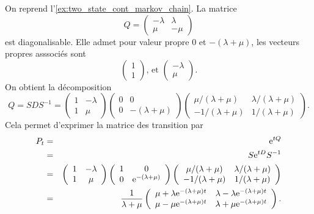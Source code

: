 \begin{ex}\label{ex:two_state_exp}
On reprend l'\cref{ex:two_state_cont_markov_chain}. La matrice 
$$
Q = \left(\begin{array}{cc}
-\lambda & \lambda\\
\mu & -\mu
\end{array}\right)
$$
est diagonalisable. Elle admet pour valeur propre $0$ et $-(\lambda + \mu)$, les vecteurs propres asssociés sont 
$$
\left(\begin{array}{c} 1\\
1\end{array}\right)\text{, et } \left(\begin{array}{c} -\lambda\\
\mu\end{array}\right).
$$
On obtient la décomposition
$$
Q = S D S^{-1} = \left(\begin{array}{cc}
1& -\lambda\\
1 & \mu
\end{array}\right)\left(\begin{array}{cc}
0& 0\\
0 & -(\lambda +\mu)
\end{array}\right)\left(\begin{array}{cc}
\mu/(\lambda + \mu) & \lambda/(\lambda + \mu)\\
-1/(\lambda + \mu)& 1/(\lambda + \mu)
\end{array}\right).
$$
Cela permet d'exprimer la matrice des transition par 
\begin{eqnarray*}
P_t &=& \mathrm{e}^{tQ}\\
 &=& S\mathrm{e}^{tD}S^{-1}\\ 
 &=& \left(\begin{array}{cc}
1& -\lambda\\
1 & \mu
\end{array}\right)\left(\begin{array}{cc}
1& 0\\
0 & \mathrm{e}^{-(\lambda +\mu)}
\end{array}\right)\left(\begin{array}{cc}
\mu/(\lambda + \mu) & \lambda/(\lambda + \mu)\\
-1/(\lambda + \mu)& 1/(\lambda + \mu)
\end{array}\right) \\
&=& \frac{1}{\lambda + \mu}
\left(\begin{array}{cc}
\mu +\lambda \mathrm{e}^{-(\lambda +\mu)t}&\lambda -\lambda \mathrm{e}^{-(\lambda +\mu)t}\\
\mu -\mu \mathrm{e}^{-(\lambda +\mu)t}&\lambda +\mu \mathrm{e}^{-(\lambda +\mu)t}\\
\end{array}\right).
\end{eqnarray*}
\end{ex}
